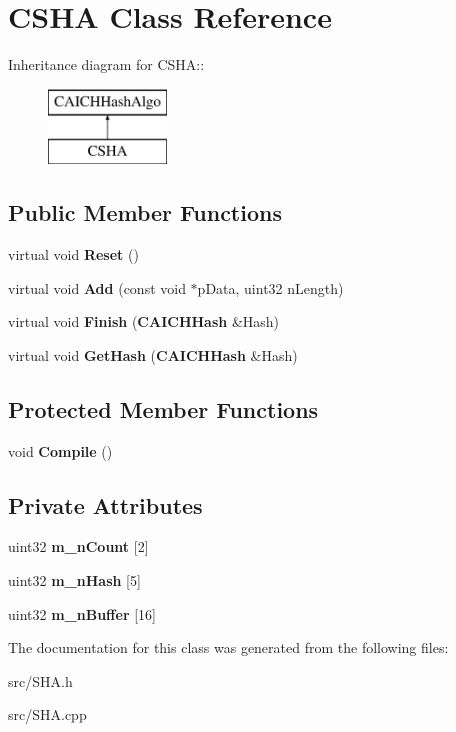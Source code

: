 \section{CSHA Class Reference}
\label{classCSHA}
Inheritance diagram for CSHA::\begin{figure}[H]
\begin{center}
\leavevmode
\includegraphics[height=2cm]{classCSHA}
\end{center}
\end{figure}
\subsection*{Public Member Functions}
\begin{DoxyCompactItemize}
\item 
virtual void {\bfseries Reset} ()\label{classCSHA_a3d8a2243d9cd9250b97a8da16b992edb}

\item 
virtual void {\bfseries Add} (const void $\ast$pData, uint32 nLength)\label{classCSHA_a7673ce8d88186086da48f76f0256ebaa}

\item 
virtual void {\bfseries Finish} ({\bf CAICHHash} \&Hash)\label{classCSHA_ad5cfa08400f2a4ea51300a24c9f84bf2}

\item 
virtual void {\bfseries GetHash} ({\bf CAICHHash} \&Hash)\label{classCSHA_a267b80d8a79e1b46234607b1753719ac}

\end{DoxyCompactItemize}
\subsection*{Protected Member Functions}
\begin{DoxyCompactItemize}
\item 
void {\bfseries Compile} ()\label{classCSHA_aa1a0ba82e70592e0ab185d91acf183e6}

\end{DoxyCompactItemize}
\subsection*{Private Attributes}
\begin{DoxyCompactItemize}
\item 
uint32 {\bfseries m\_\-nCount} [2]\label{classCSHA_a28bd7c29cd8325e9669fe00bcc949a79}

\item 
uint32 {\bfseries m\_\-nHash} [5]\label{classCSHA_a9a01d3aff9e87f19464bbf90425d17a8}

\item 
uint32 {\bfseries m\_\-nBuffer} [16]\label{classCSHA_a97e1dfdec9a07f88cecd3783b1045eb6}

\end{DoxyCompactItemize}


The documentation for this class was generated from the following files:\begin{DoxyCompactItemize}
\item 
src/SHA.h\item 
src/SHA.cpp\end{DoxyCompactItemize}
